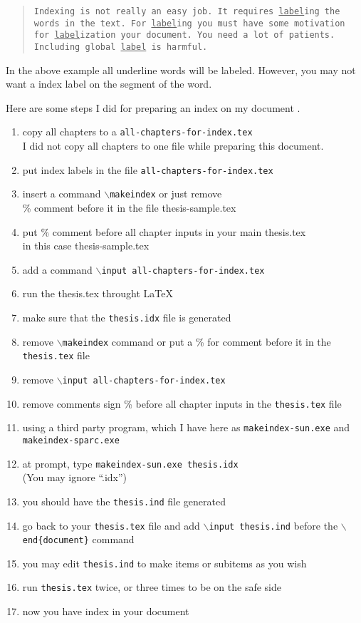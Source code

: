 \begin{verse}
{\tt Indexing is not really an easy job. It requires
\underline{label}ing the words in the text. For \underline{label}ing
you must have some motivation for \underline{label}ization your
document. You need a lot of patients. Including global
\underline{label} is harmful.}
\end{verse}

In the above example all underline words will be labeled. However,
you may not want a index label on the segment of the word.

Here are some steps I did for preparing an index on my document 
	\cite{soomro94}.
\begin{enumerate}
   \item copy all chapters to a {\tt all-chapters-for-index.tex}\\
	I did not copy all chapters to one file while preparing this document.
   \item put index labels in the file 
		{\tt all-chapters-for-index.tex}
   \item insert a command {\tt $\backslash$makeindex} or just remove\\
	\% comment before it in the file thesis-sample.tex
   \item put \% comment before all chapter inputs in your main thesis.tex\\
	in this case thesis-sample.tex
   \item add a command {\tt $\backslash$input all-chapters-for-index.tex}
   \item run the thesis.tex throught \LaTeX
   \item make sure that the {\tt thesis.idx} file is generated
   \item remove {\tt $\backslash$makeindex} command or put a \% for comment 
		before it in the {\tt thesis.tex} file
   \item remove {\tt $\backslash$input all-chapters-for-index.tex}
   \item remove comments sign \% before all chapter inputs in the
		{\tt thesis.tex} file
   \item using a third party program, which I have here as 
		{\tt makeindex-sun.exe} and {\tt makeindex-sparc.exe}   
   \item at prompt, type {\tt makeindex-sun.exe thesis.idx}\\
		(You may ignore ``.idx'')
   \item you should have the {\tt thesis.ind} file generated
   \item go back to your {\tt thesis.tex} file and add 
		{\tt $\backslash$input thesis.ind} before the
	{\tt $\backslash$end\{document\}} command
   \item you may edit {\tt thesis.ind} to make items or subitems as you wish
   \item run {\tt thesis.tex} twice, or three times to be on the safe side
   \item now you have index in your document
\end{enumerate}
